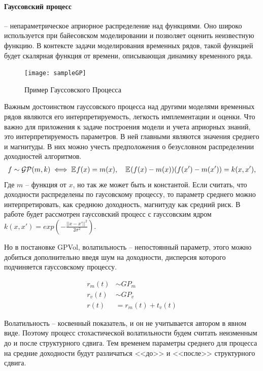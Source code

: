 \paragraph{Гауссовский процесс} -- непараметрическое априорное распределение над функциями. Оно широко используется при байесовском моделировании и позволяет оценить неизвестную функцию. В контексте задачи моделирования временных рядов, такой функцией будет скалярная функция от времени, описывающая динамику временного ряда.
\begin{figure}[h]
	\centering
	\texttt{[image: sampleGP]}
	\caption{Пример Гауссовского Процесса}
\end{figure}
Важным достоинством гауссовского процесса над другими моделями временных рядов являются его интерпретируемость, легкость имплементации и оценки. Что важно для приложения к задаче построения модели и учета априорных знаний, это интерпретируемость параметров. В ней главными являются значения среднего и магнитуды. В них можно учесть предположения о безусловном распределении доходностей алгоритмов.
\begin{align}
	f \sim \mathcal{GP}(m, k) \iff \mathbb{E}_{{}}{{f(x)}} = m(x),\quad \mathbb{E}_{{}}{{(f(x) - m(x))(f(x')-m(x'))}} = k(x, x'),
\end{align}
Где $m$ -- функция от $x$, но так же может быть и константой. Если считать, что доходности распределены по гаусовскому процессу, то параметр среднего можно интерпретировать, как среднюю доходность, магнитуду как средний риск. В работе будет рассмотрен гауссовский процесс с гауссовским ядром $k(x, x')=exp(-\tfrac{||x-x'||^2}{2\sigma^2})$.

Но в постановке GPVol, волатильность -- непостоянный параметр, этого можно добиться дополнительно введя шум на доходности, дисперсия которого подчиняется гауссовскому процессу.

\begin{align}
	r_m(t) & \sim GP_m\\
	r_v(t) & \sim GP_v\\
	r(t) & = r_m(t) + t_v(t)
\end{align}

Волатильность -- косвенный показатель, и он не учитывается автором в явном виде. Поэтому процесс стохастической волатильности будем считать неизменным до и после структурного сдвига. Тем временем параметры среднего для процесса на средние доходности будут различаться <<до>> и <<после>> структурного сдвига.

